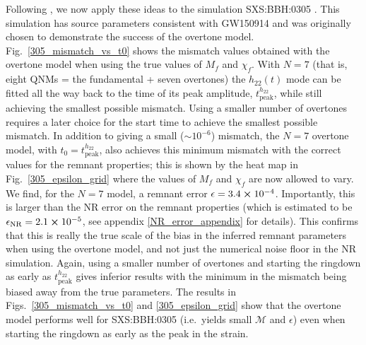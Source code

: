 Following \cite{Giesler:2019uxc}, we now apply these ideas to the simulation SXS:BBH:0305 \cite{Lovelace:2016uwp, sxs_catalog}.
This simulation has source parameters consistent with GW150914 and was originally chosen to demonstrate the success of the overtone model. 
Fig.~\ref{305_mismatch_vs_t0} shows the mismatch values obtained with the overtone model when using the true values of $M_f$ and $\chi_f$.
With $N=7$ (that is, eight QNMs = the fundamental + seven overtones) the $h_{22}(t)$ mode can be fitted all the way back to the time of its peak amplitude, $t_{\mathrm{peak}}^{h_{22}}$, while still achieving the smallest possible mismatch.
Using a smaller number of overtones requires a later choice for the start time to achieve the smallest possible mismatch.
In addition to giving a small ($\sim 10^{-6}$) mismatch, the $N=7$ overtone model, with $t_0 = t_{\mathrm{peak}}^{h_{22}}$, also achieves this minimum mismatch with the correct values for the remnant properties; this is shown by the heat map in Fig.~\ref{305_epsilon_grid} where the values of $M_f$ and $\chi_f$ are now allowed to vary. 
We find, for the $N=7$ model, a remnant error $\epsilon = 3.4 \cross 10^{-4}$. 
Importantly, this is larger than the NR error on the remnant properties (which is estimated to be $\epsilon_{\mathrm{NR}} = 2.1 \cross 10^{-5}$, see appendix \ref{NR_error_appendix} for details). This confirms that this is really the true scale of the bias in the inferred remnant parameters when using the overtone model, and not just the numerical noise floor in the NR simulation.
Again, using a smaller number of overtones and starting the ringdown as early as $t_{\mathrm{peak}}^{h_{22}}$ gives inferior results with the minimum in the mismatch being biased away from the true parameters.
The results in Figs.~\ref{305_mismatch_vs_t0} and \ref{305_epsilon_grid} show that the overtone model performs well for SXS:BBH:0305 (i.e.\ yields small $\mathcal{M}$ and $\epsilon$) even when starting the ringdown as early as the peak in the strain.

